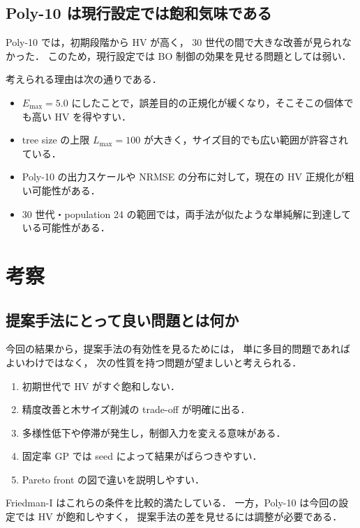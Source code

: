 \documentclass[a4paper,11pt]{ltjsarticle}
\begin{document}
\subsection{Poly-10 は現行設定では飽和気味である}

Poly-10 では，初期段階から HV が高く，
30 世代の間で大きな改善が見られなかった．
このため，現行設定では BO 制御の効果を見せる問題としては弱い．

考えられる理由は次の通りである．

\begin{itemize}
  \item \(E_{\max}=5.0\) にしたことで，誤差目的の正規化が緩くなり，そこそこの個体でも高い HV を得やすい．
  \item tree size の上限 \(L_{\max}=100\) が大きく，サイズ目的でも広い範囲が許容されている．
  \item Poly-10 の出力スケールや NRMSE の分布に対して，現在の HV 正規化が粗い可能性がある．
  \item 30 世代・population 24 の範囲では，両手法が似たような単純解に到達している可能性がある．
\end{itemize}

\section{考察}

\subsection{提案手法にとって良い問題とは何か}

今回の結果から，提案手法の有効性を見るためには，
単に多目的問題であればよいわけではなく，
次の性質を持つ問題が望ましいと考えられる．

\begin{enumerate}
  \item 初期世代で HV がすぐ飽和しない．
  \item 精度改善と木サイズ削減の trade-off が明確に出る．
  \item 多様性低下や停滞が発生し，制御入力を変える意味がある．
  \item 固定率 GP では seed によって結果がばらつきやすい．
  \item Pareto front の図で違いを説明しやすい．
\end{enumerate}

Friedman-I はこれらの条件を比較的満たしている．
一方，Poly-10 は今回の設定では HV が飽和しやすく，
提案手法の差を見せるには調整が必要である．
\end{document}
